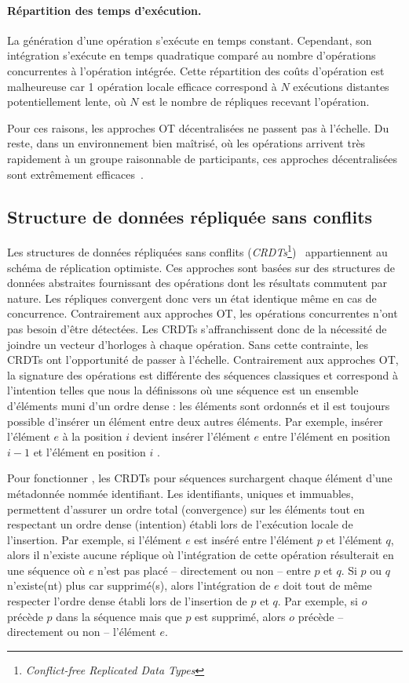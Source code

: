 \paragraph{Répartition des temps d'exécution.} La génération d'une opération
s'exécute en temps constant. Cependant, son intégration s'exécute en temps
quadratique comparé au nombre d'opérations concurrentes à l'opération
intégrée. Cette répartition des coûts d'opération est malheureuse car 1
opération locale efficace correspond à $N$ exécutions distantes potentiellement
lente, où $N$ est le nombre de répliques recevant l'opération.

Pour ces raisons, les approches OT décentralisées ne passent pas à l'échelle. Du
reste, dans un environnement bien maîtrisé, où les opérations arrivent très
rapidement à un groupe raisonnable de participants, ces approches décentralisées
sont extrêmement efficaces~\cite{mehdi2014merging}.

\subsection{Structure de données répliquée sans conflits}
\label{repl:subsec:crdts}

Les structures de données répliquées sans conflits
(\emph{CRDTs}\footnote{\emph{Conflict-free Replicated Data
    Types}})~\cite{shapiro2011comprehensive, shapiro2011conflict} appartiennent
au schéma de réplication optimiste. Ces approches sont basées sur des structures
de données abstraites fournissant des opérations dont les résultats commutent
par nature. Les répliques convergent donc vers un état identique même en cas de
concurrence. Contrairement aux approches OT, les opérations concurrentes n'ont
pas besoin d'être détectées. Les CRDTs s'affranchissent donc de la nécessité de
joindre un vecteur d'horloges à chaque opération. Sans cette contrainte, les
CRDTs ont l'opportunité de passer à l'échelle. Contrairement aux approches OT,
la signature des opérations est différente des séquences \og classiques \fg et
correspond à l'intention telles que nous la définissons où une séquence est un
ensemble d'éléments muni d'un ordre dense : les éléments sont ordonnés et il est
toujours possible d'insérer un élément entre deux autres éléments. Par exemple,
\og insérer l'élément $e$ à la position $i$ \fg devient \og insérer l'élément
$e$ entre l'élément en position $i-1$ et l'élément en position $i$ \fg.

Pour fonctionner , les CRDTs pour séquences surchargent chaque élément d'une
métadonnée nommée identifiant. Les identifiants, uniques et immuables,
permettent d'assurer un ordre total (convergence) sur les éléments tout en
respectant un ordre dense (intention) établi lors de l'exécution locale de
l'insertion. Par exemple, si l'élément $e$ est inséré entre l'élément $p$ et
l'élément $q$, alors il n'existe aucune réplique où l'intégration de cette
opération résulterait en une séquence où $e$ n'est pas placé -- directement ou
non -- entre $p$ et $q$.  Si $p$ ou $q$ n'existe(nt) plus car supprimé(s), alors
l'intégration de $e$ doit tout de même respecter l'ordre dense établi lors de
l'insertion de $p$ et $q$. Par exemple, si $o$ précède $p$ dans la séquence mais
que $p$ est supprimé, alors $o$ précède -- directement ou non -- l'élément $e$.

